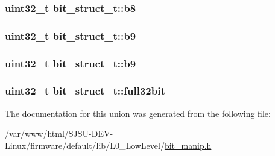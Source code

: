 \subsubsection[{\texorpdfstring{b8}{b8}}]{\setlength{\rightskip}{0pt plus 5cm}uint32\+\_\+t bit\+\_\+struct\+\_\+t\+::b8}\hypertarget{unionbit__struct__t_a246a1636e6d8628ac7f5d3b515d283b6}{}\label{unionbit__struct__t_a246a1636e6d8628ac7f5d3b515d283b6}
\subsubsection[{\texorpdfstring{b9}{b9}}]{\setlength{\rightskip}{0pt plus 5cm}uint32\+\_\+t bit\+\_\+struct\+\_\+t\+::b9}\hypertarget{unionbit__struct__t_a79aed403b826c5ca3e1541843819b2bd}{}\label{unionbit__struct__t_a79aed403b826c5ca3e1541843819b2bd}
\subsubsection[{\texorpdfstring{b9\+\_\+8}{b9_8}}]{\setlength{\rightskip}{0pt plus 5cm}uint32\+\_\+t bit\+\_\+struct\+\_\+t\+::b9\+\_}\hypertarget{unionbit__struct__t_a1f748b48a12aa4cc9f39ae4795544076}{}\label{unionbit__struct__t_a1f748b48a12aa4cc9f39ae4795544076}
\subsubsection[{\texorpdfstring{full32bit}{full32bit}}]{\setlength{\rightskip}{0pt plus 5cm}uint32\+\_\+t bit\+\_\+struct\+\_\+t\+::full32bit}\hypertarget{unionbit__struct__t_aa0cf0a126273dac31f0dca900191aed6}{}\label{unionbit__struct__t_aa0cf0a126273dac31f0dca900191aed6}


The documentation for this union was generated from the following file\+:\begin{DoxyCompactItemize}
\item 
/var/www/html/\+S\+J\+S\+U-\/\+D\+E\+V-\/\+Linux/firmware/default/lib/\+L0\+\_\+\+Low\+Level/\hyperlink{bit__manip_8h}{bit\+\_\+manip.\+h}\end{DoxyCompactItemize}
